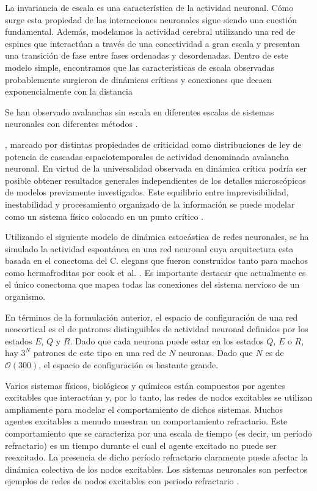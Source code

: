 La invariancia de escala es una característica de la actividad neuronal. Cómo surge esta propiedad de las interacciones neuronales sigue siendo una cuestión fundamental.
Además, modelamos la actividad cerebral utilizando una red de espines que interactúan a través de una conectividad a gran escala y presentan una transición de fase entre fases ordenadas y desordenadas. Dentro de este modelo simple, encontramos que las características de escala observadas probablemente surgieron de dinámicas críticas y conexiones que decaen exponencialmente con la distancia


Se han observado avalanchas sin escala en diferentes escalas de sistemas neuronales con diferentes métodos \cite{zhou_optimal_2021}.


, marcado por distintas propiedades de criticidad como distribuciones de ley de potencia de cascadas espaciotemporales de actividad denominada avalancha neuronal.  
En virtud de la universalidad observada en dinámica crítica podría ser posible obtener resultados generales independientes de los detalles microscópicos de modelos previamente investigados.  Este equilibrio entre imprevisibilidad, inestabilidad y procesamiento organizado de la información se puede modelar como un sistema físico colocado en un punto crítico \cite{chialvo_emergent_2010}.

Utilizando el siguiente modelo  de dinámica estocástica de redes neuronales, se ha  simulado la actividad espontánea en una red neuronal cuya arquitectura esta basada en el conectoma del C. elegans   que fueron construidos tanto para machos como hermafroditas por cook et al. \cite{cook_whole-animal_2019}. Es importante destacar que actualmente es el único   conectoma  que mapea todas las conexiones del sistema nervioso de un organismo. 


En términos de la formulación anterior, el espacio de configuración de una red neocortical es el de patrones distinguibles de actividad neuronal definidos por los estados $E$, $Q$ y $R$. Dado que cada neurona puede estar en los estados $Q$, $E$ o $R$, hay $3^N$ patrones de este tipo en una red de $N$ neuronas. Dado que $N$ es de $\mathcal{O}(300)$, el espacio de configuración es bastante grande. 


Varios sistemas físicos, biológicos y químicos están compuestos por agentes excitables que interactúan y, por lo tanto, las redes de nodos excitables se utilizan ampliamente para modelar el comportamiento de dichos sistemas. Muchos agentes excitables a menudo muestran un comportamiento refractario. Este comportamiento que se caracteriza por una escala de tiempo (es decir, un período refractario) es un tiempo durante el cual el agente excitado no puede ser reexcitado. La presencia de dicho período refractario claramente puede afectar la dinámica colectiva de los nodos excitables. Los sistemas neuronales son perfectos ejemplos de redes de nodos excitables con periodo refractario \cite{moosavi_refractory_2017}.




